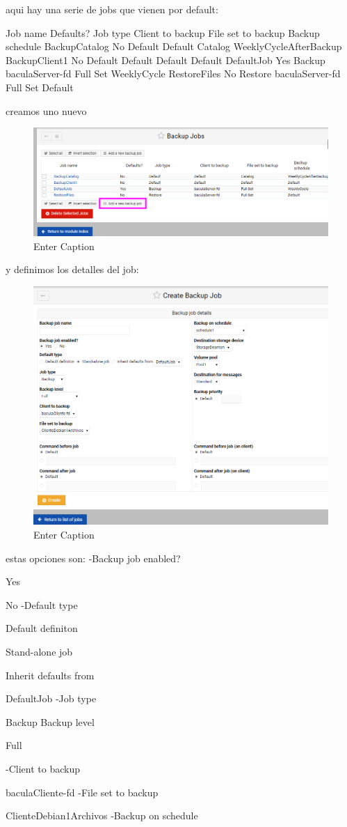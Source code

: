 aqui hay una serie de jobs que vienen por default:

Job name	Defaults?	Job type	Client to backup	File set to backup	Backup schedule
BackupCatalog	No	Default	Default	Catalog	WeeklyCycleAfterBackup
BackupClient1	No	Default	Default	Default	Default
DefaultJob	Yes	Backup	baculaServer-fd	Full Set	WeeklyCycle
RestoreFiles	No	Restore	baculaServer-fd	Full Set	Default

creamos uno nuevo

\begin{figure}[H]
    \centering
    \includegraphics[width=0.5\linewidth]{instalacionBacula/createnewjob.png}
    \caption{Enter Caption}
\end{figure}

y definimos los detalles del job:
\begin{figure}[H]
    \centering
    \includegraphics[width=0.5\linewidth]{instalacionBacula/Backupjobdetails.png}
    \caption{Enter Caption}
\end{figure}
estas opciones son:
-Backup job enabled?

  Yes 
 
  No 
-Default type

  Default definiton 
 
  Stand-alone job 
 
  Inherit defaults from 

  DefaultJob
-Job type

Backup
Backup level

Full

-Client to backup

baculaCliente-fd
-File set to backup

ClienteDebian1Archivos
-Backup on schedule

